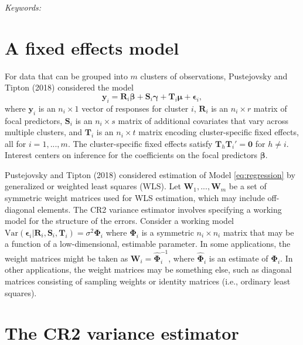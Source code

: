 \documentclass[12pt]{article}
\begin{document}
\noindent%
{\it Keywords:} 
\vfill

\newpage
{} %

\hypertarget{a-fixed-effects-model}{%
\section{A fixed effects model}\label{a-fixed-effects-model}}

For data that can be grouped into \(m\) clusters of observations,
Pustejovsky and Tipton (2018) considered the model \begin{equation}
\label{eq:regression}
\mathbf{y}_i = \mathbf{R}_i \boldsymbol\beta + \mathbf{S}_i \boldsymbol\gamma + \mathbf{T}_i \boldsymbol\mu + \boldsymbol\epsilon_i,
\end{equation} where \(\mathbf{y}_i\) is an \(n_i \times 1\) vector of
responses for cluster \(i\), \(\mathbf{R}_i\) is an \(n_i \times r\)
matrix of focal predictors, \(\mathbf{S}_i\) is an \(n_i \times s\)
matrix of additional covariates that vary across multiple clusters, and
\(\mathbf{T}_i\) is an \(n_i \times t\) matrix encoding cluster-specific
fixed effects, all for \(i = 1,...,m\). The cluster-specific fixed
effects satisfy \(\mathbf{T}_h \mathbf{T}_i' = \mathbf{0}\) for
\(h \neq i\). Interest centers on inference for the coefficients on the
focal predictors \(\boldsymbol\beta\).

Pustejovsky and Tipton (2018) considered estimation of Model
\ref{eq:regression} by generalized or weighted least squares (WLS). Let
\(\mathbf{W}_1,...,\mathbf{W}_m\) be a set of symmetric weight matrices
used for WLS estimation, which may include off-diagonal elements. The
CR2 variance estimator involves specifying a working model for the
structure of the errors. Consider a working model
\(\text{Var}\left(\boldsymbol\epsilon_i | \mathbf{R}_i, \mathbf{S}_i, \mathbf{T}_i\right) = \sigma^2 \boldsymbol\Phi_i\)
where \(\boldsymbol\Phi_i\) is a symmetric \(n_i \times n_i\) matrix
that may be a function of a low-dimensional, estimable parameter. In
some applications, the weight matrices might be taken as
\(\mathbf{W}_i = \boldsymbol{\hat\Phi}_i^{-1}\), where
\(\boldsymbol{\hat\Phi}_i\) is an estimate of \(\boldsymbol\Phi_i\). In
other applications, the weight matrices may be something else, such as
diagonal matrices consisting of sampling weights or identity matrices
(i.e., ordinary least squares).

\hypertarget{the-cr2-variance-estimator}{%
\section{The CR2 variance estimator}\label{the-cr2-variance-estimator}}
\end{document}
